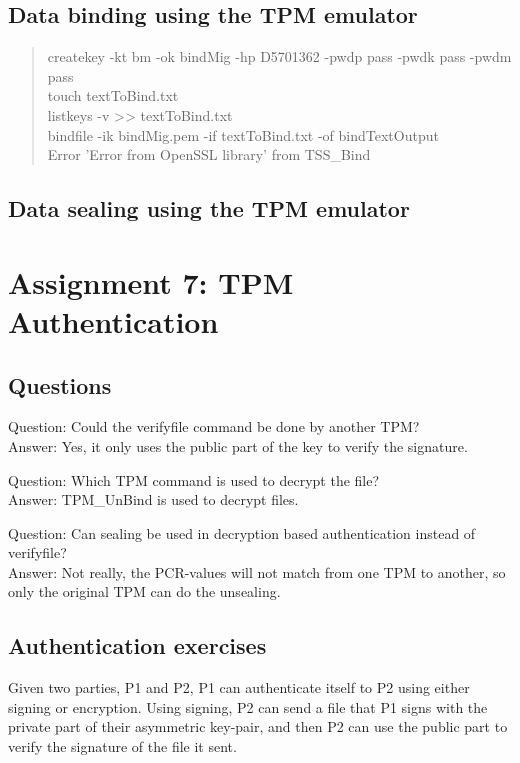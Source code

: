\documentclass[10pt]{article}
\begin{document}
\subsection{Data binding using the TPM emulator}
\begin{quote}
createkey -kt bm -ok bindMig -hp D5701362 -pwdp pass -pwdk pass -pwdm pass \\
touch textToBind.txt\\
listkeys -v >> textToBind.txt \\
bindfile -ik bindMig.pem -if textToBind.txt -of bindTextOutput \\
Error 'Error from OpenSSL library' from TSS\_Bind
\end{quote}

\subsection{Data sealing using the TPM emulator}
\section{Assignment 7: TPM Authentication}

  \subsection{Questions}

    Question: Could the verifyfile command be done by another TPM? \\
    Answer: Yes, it only uses the public part of the key to verify the signature.

    Question: Which TPM command is used to decrypt the file? \\
    Answer: TPM\_UnBind is used to decrypt files.

    Question: Can sealing be used in decryption based authentication instead of
    verifyfile? \\
    Answer: Not really, the PCR-values will not match from one TPM to another, so only
    the original TPM can do the unsealing.

  \subsection{Authentication exercises}

    Given two parties, P1 and P2, P1 can authenticate itself to P2 using either
    signing or encryption. Using signing, P2 can send a file that P1 signs with
    the private part of their asymmetric key-pair, and then P2 can use the
    public part to verify the signature of the file it sent.
\end{document}
